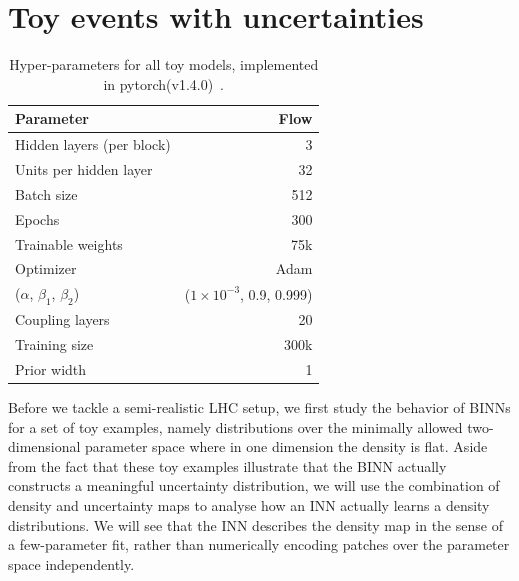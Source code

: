 \section{Toy events with uncertainties}
\label{sec:toy}

\begin{table}[b!]
\begin{small} \begin{center}
\begin{tabular}{l r }
\toprule
Parameter & Flow\\
\midrule
Hidden layers (per block) & 3 \\
Units per hidden layer & 32 \\
Batch size & 512\\
Epochs & 300 \\
Trainable weights &  75k  \\
Optimizer & Adam \\
($\alpha$, $\beta_1$, $\beta_2$)  & ($1\times10^{-3}$, 0.9, 0.999) \\
Coupling layers & 20 \\
Training size & 300k \\
Prior width & 1 \\
\bottomrule
\end{tabular}
\end{center} \end{small}
\caption{Hyper-parameters for all toy models, implemented in pytorch(v1.4.0)~\cite{pytorch}.}
\label{tab:toy_params}
\end{table}

Before we tackle a semi-realistic LHC setup, we first study the
behavior of BINNs for a set of toy examples, namely distributions over
the minimally allowed two-dimensional parameter space where in one
dimension the density is flat. Aside from the fact that these toy
examples illustrate that the BINN actually constructs a meaningful
uncertainty distribution, we will use the combination of density and
uncertainty maps to analyse how an INN actually learns a density
distributions. We will see that the INN describes the density map in
the sense of a few-parameter fit, rather than numerically encoding
patches over the parameter space independently.

